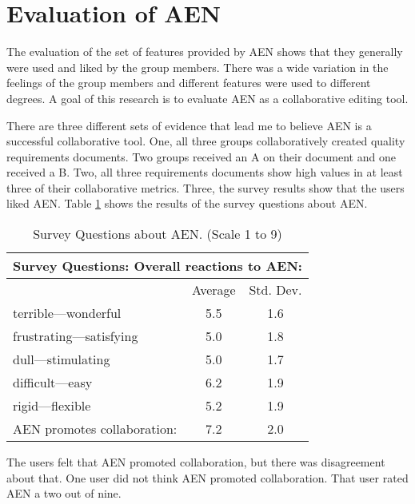\section{Evaluation of AEN}
\label{sec:eval-AEN}

The evaluation of the set of features provided by AEN shows that they
generally were used and liked by the group members.  There was a wide
variation in the feelings of the group members and different features were
used to different degrees.  A goal of this research is to evaluate AEN as a
collaborative editing tool.

There are three different sets of evidence that lead me to believe AEN is a
successful collaborative tool. One, all three groups collaboratively
created quality requirements documents. Two groups received an A on their
document and one received a B.  Two, all three requirements documents show
high values in at least three of their collaborative metrics.  Three, the
survey results show that the users liked AEN.  Table \ref{tab:survey-AEN}
shows the results of the survey questions about AEN.

\small
\begin{table}[htb]
  \caption{Survey Questions about AEN. (Scale 1 to 9)}
  \begin{center}
    \begin{tabular}{|l|c|c|}
      \hline
      \multicolumn{3}{|c|}{\rule[-3mm]{0mm}{8mm}\bf Survey Questions:
      Overall reactions to AEN:}\\ \hline
      &Average&Std. Dev.\\ \hline
      terrible---wonderful&5.5&1.6\\\hline
      frustrating---satisfying&5.0&1.8\\\hline
      dull---stimulating&5.0&1.7\\\hline
      difficult---easy&6.2&1.9\\\hline
      rigid---flexible&5.2&1.9\\\hline\hline
      AEN promotes collaboration:&7.2&2.0\\\hline
    \end{tabular}
  \end{center}
  \label{tab:survey-AEN}
\end{table}
\normalsize

The users felt that AEN promoted collaboration, but there was disagreement
about that.  One user did not think AEN promoted collaboration.  That user
rated AEN a two out of nine.


